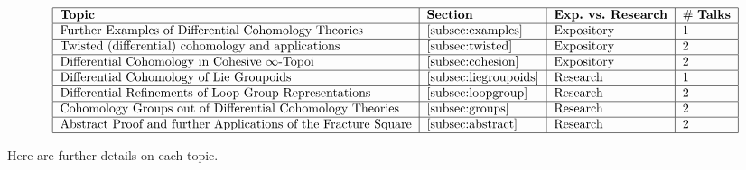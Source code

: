 \documentclass[a4paper]{book}
\theoremstyle{definition}
\theoremstyle{remark}
\numberwithin{equation}{section}
\begin{document}
\[
\begin{tabular}{|l|l|l|l|}
  \hline 
  \textbf{Topic} & \textbf{Section} & \textbf{Exp.~vs.~Research} & \# \textbf{Talks}\\ \hline
  Further Examples of Differential Cohomology Theories & \cref{subsec:examples} & Expository & 1 \\ \hline
  Twisted (differential) cohomology and applications & \cref{subsec:twisted} & Expository & 2\\ \hline
  Differential Cohomology in Cohesive $\infty$-Topoi & \cref{subsec:cohesion} & Expository & 2\\ \hline
  Differential Cohomology of Lie Groupoids & \cref{subsec:liegroupoids} & Research & 1\\ \hline
  Differential Refinements of Loop Group Representations & \cref{subsec:loopgroup} & Research & 2\\ \hline
  Cohomology Groups out of Differential Cohomology Theories & \cref{subsec:groups} & Research & 2\\ \hline
  Abstract Proof and further Applications of the Fracture Square & \cref{subsec:abstract} & Research & 2\\ \hline
\end{tabular}
\]

Here are further details on each topic.
\end{document}
